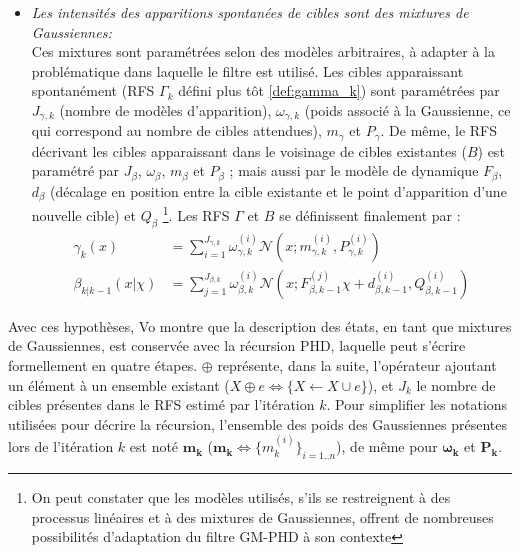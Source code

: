 \begin{itemize}
	\item{\emph{Les intensités des apparitions spontanées de cibles sont des mixtures de Gaussiennes:}\\}
	Ces mixtures sont paramétrées selon des modèles arbitraires, à adapter à la problématique dans laquelle le filtre est utilisé. Les cibles apparaissant spontanément (RFS $\Gamma_k$ défini plus tôt \ref{def:gamma_k}) sont paramétrées par $J_{\gamma, k}$ (nombre de modèles d'apparition), $\omega_{\gamma,k}$ (poids associé à la Gaussienne, ce qui correspond au nombre de cibles attendues), $m_\gamma$ et $P_\gamma$. De même, le RFS décrivant les cibles apparaissant dans le voisinage de cibles existantes ($B$) est paramétré par $J_\beta$, $\omega_\beta$, $m_\beta$ et $P_\beta$ ; mais aussi par le modèle de dynamique $F_\beta$, $d_\beta$ (décalage en position entre la cible existante et le point d'apparition d'une nouvelle cible) et $Q_\beta$ \footnote{On peut constater que les modèles utilisés, s'ils se restreignent à des processus linéaires et à des mixtures de Gaussiennes, offrent de nombreuses possibilités d'adaptation du filtre GM-PHD à son contexte}. Les RFS $\Gamma$ et $B$ se définissent finalement par :
	\begin{align}
		\gamma_k(x) 								&= \sum\limits_{i=1}^{J_{\gamma, k}} \omega_{\gamma, k}^{(i)} \mathcal{N} (x; m_{\gamma, k}^{(i)}, P_{\gamma, k}^{(i)} ) \\
		\beta_{k | k-1} (x | \chi) 	&= \sum\limits_{j=1}^{J_{\beta, k}}  \omega_{\beta, k}^{(i)} 	\mathcal{N} (x; F_{\beta, k-1}^{(j)} \chi + d_{\beta, k-1}^{(i)}, Q_{\beta, k-1}^{(i)} )
	\end{align}
\end{itemize}

Avec ces hypothèses, Vo montre que la description des états, en tant que mixtures de Gaussiennes, est conservée avec la récursion PHD, laquelle peut s'écrire formellement en quatre étapes. $\oplus$ représente, dans la suite, l'opérateur ajoutant un élément à un ensemble existant ($ X \oplus e \Leftrightarrow \lbrace X \leftarrow X \cup e \rbrace$), et $J_k$ le nombre de cibles présentes dans le RFS estimé par l'itération $k$. Pour simplifier les notations utilisées pour décrire la récursion, l'ensemble des poids des Gaussiennes présentes lors de l'itération $k$ est noté $\mathbf{m_k}$  ($\mathbf{m_k} \Leftrightarrow \lbrace m_k^{(i)}\rbrace_{i=1..n}$), de même pour $\mathbf{\omega_k}$ et $\mathbf{P_k}$.\\


